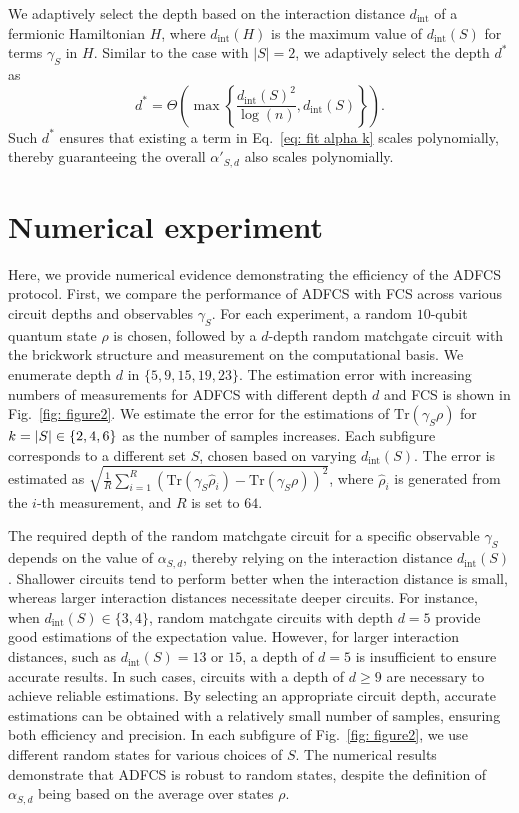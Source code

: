 \documentclass[showpacs,twocolumn,aps,prx,long bibliography,superscriptaddress,notitlepage]{revtex4-1}
\newcommand{\cbra}[1]{\{ #1 \}}
\newcommand{\tra}[1]{\text{Tr}\left( #1 \right)}
\begin{document}
We adaptively select the depth based on the interaction distance $ d_{\text{int}} $ of a fermionic Hamiltonian $H$, where $d_{\text{int}}(H)$ is the maximum value of $d_{\text{int}}(S)$ for terms $\gamma_S$ in $H$. Similar to the case with $|S|=2$, we adaptively select the depth $d^\ast$ as 
\begin{equation}
    d^\ast = \Theta\left(\max\left\{ \frac{d_{\text{int}}(S)^2}{\log(n)} , d_{\text{int}}(S)\right\}\right).
    \label{eq: adaptive depth}
\end{equation}
Such $ d^\ast $ ensures that {existing} a term in Eq.~\eqref{eq: fit alpha k} scales polynomially, thereby guaranteeing the overall $\alpha'_{S,d}$ also scales polynomially. 



\section{Numerical experiment}
\label{sec: numerical exp}


Here, we provide numerical evidence demonstrating the efficiency of the ADFCS protocol. First, we compare the performance of ADFCS with FCS across various circuit depths and observables $\gamma_S$. For each experiment, a random $10$-qubit quantum state $\rho$ is chosen, followed by a $d$-depth random matchgate circuit with the brickwork structure and measurement on the computational basis. We enumerate depth $d$ in $\cbra{5,9,15,19,23}$. The estimation error with increasing numbers of measurements for ADFCS with different depth $d$ and FCS is shown in Fig.~\ref{fig: figure2}.
We estimate the error for the estimations of $\tra{\gamma_S \rho}$ for $k=\abs{S} \in\cbra{2,4,6}$ as the number of samples increases. Each subfigure corresponds to a different set $S$, chosen based on varying $d_\text{int}(S)$.
 The error is estimated as $\sqrt{\frac{1}{R}\sum_{i = 1}^R (\tra{\gamma_S\hat{\rho}_i} - \tra{\gamma_S\rho})^2} $, where $\hat{\rho}_i$ is generated from the $i$-th measurement, and $R$ is set to $64$. 


The required depth of the random matchgate circuit for a specific observable $\gamma_S$ depends on the value of $\alpha_{S,d}$, thereby relying on the interaction distance $d_\text{int}(S)$.
Shallower circuits tend to perform better when the interaction distance is small, whereas larger interaction distances necessitate deeper circuits. For instance, when $d_\text{int}(S)\in \{3,4\} $, random matchgate circuits with depth $d = 5$ provide good estimations of the expectation value. However, for larger interaction distances, such as $d_\text{int}(S) = 13$ or $15$, a depth of $d = 5$ is insufficient to ensure accurate results. In such cases, circuits with a depth of $d \geq 9$ are necessary to achieve reliable estimations. By selecting an appropriate circuit depth, accurate estimations can be obtained with a relatively small number of samples, ensuring both efficiency and precision.
In each subfigure of Fig.~\ref{fig: figure2}, we use different random states for various choices of $S$. The numerical results demonstrate that ADFCS is robust to random states, despite the definition of $\alpha_{S,d}$ being based on the average over states $\rho$.
\end{document}
